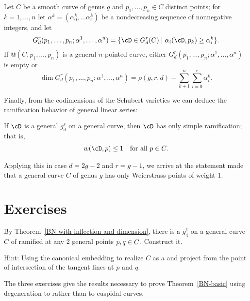 \begin{theorem}\label{BN with inflection and dimension}
Let $C$ be a smooth curve of genus $g$ and $p_1,\dots,p_n \in C$ distinct
points; for $k = 1,\dots,n$ let $\alpha^k = (\alpha^k_0,\dots\alpha^k_r)$
be a nondecreasing sequence of nonnegative integers, and let
$$
G^r_d(p_1,\dots,p_n; \alpha^1,\dots,\alpha^n) = \{\cD \in G^r_d(C)
\mid \alpha_i(\cD, p_k) \geq \alpha^k_i \}.
$$
If $@(C, p_1,\dots,p_n)$ is a general $n$-pointed curve, 
either
$G^r_d(p_1,\dots,p_n; \alpha^1,\dots,\alpha^n)$ is empty or
$$
\dim G^r_d(p_1,\dots,p_n; \alpha^1,\dots,\alpha^n) = \rho(g,r,d) -
\sum_{k+1}^n \sum_{i=0}^r \alpha^k_i.
$$
\end{theorem}

Finally, from the codimensions of the Schubert varieties  we can deduce
the ramification behavior of general
linear series:

\begin{theorem}
If $\cD$ is a general $g^r_d$ on a general curve, then $\cD$ has only
%
simple ramification; that is,
$$
w(\cD, p) \leq 1 \quad \text{for all } p \in C.
$$
\end{theorem}

Applying this in case $d=2g-2$ and $r = g-1$, we arrive at the
statement made
that a general
curve $C$ of genus $g$ has only Weierstrass points of weight 1.

\section{Exercises}

\begin{exercise}
  By Theorem~\ref{BN with inflection and dimension}, there is a $g^1_4$
  on a general curve $C$ of 
ramified at any 2 general points $p,
\index{g@$g^1_4$}%
\index{genus 3}%
  q \in C$. Construct it.

  Hint: Using the canonical embedding to realize $C$ as a 
%
  and project from the point of intersection of the tangent lines at $p$
  and $q$.
\end{exercise}

The 
three exercises give the results necessary to prove
Theorem~\ref{BN-basic} using degeneration to
%
rather than to cuspidal curves.

